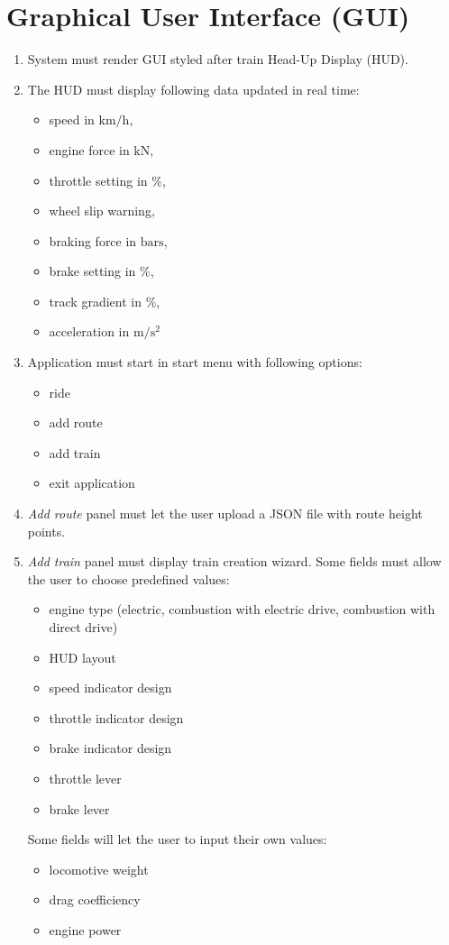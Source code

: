 \documentclass[12pt,a4paper]{report}
\DeclareRobustCommand{\reqLabel}[2]
{\hspace{16pt}\textbullet\hspace{7pt}\bfseries#1-\padzeroes[3]{\decimal{#2}}:}
\begin{document}
\section{Graphical User Interface (GUI)}
\begin{enumerate}[label=\reqLabel{FR-GUI}*, align=left]
    \item System must render GUI styled after train Head-Up Display (HUD).
    \item The HUD must display following data updated in real time:
    \begin{itemize}
        \item speed in $\mathrm{km/h}$, 
        \item engine force in $\mathrm{kN}$, 
        \item throttle setting in $\%$, 
        \item wheel slip warning, 
        \item braking force in $\mathrm{bars}$, 
        \item brake setting in $\%$, 
        \item track gradient in $\%$, 
        \item acceleration in $\mathrm{m/s^2}$
    \end{itemize} 
    \item Application must start in start menu with following options:
    \begin{itemize}
        \item ride
        \item add route
        \item add train
        \item exit application
    \end{itemize}
    \item \textit{Add route} panel must let the user upload a JSON file with route height points.
    \item \textit{Add train} panel must display train creation wizard. Some fields must allow the user to choose predefined values:
    \begin{itemize}
        \item engine type (electric, combustion with electric drive, combustion with direct drive)
        \item HUD layout
        \item speed indicator design
        \item throttle indicator design
        \item brake indicator design
        \item throttle lever
        \item brake lever
    \end{itemize}
    Some fields will let the user to input their own values:
    \begin{itemize}
        \item locomotive weight
        \item drag coefficiency
        \item engine power
    \end{itemize}
\end{enumerate}
\end{document}
